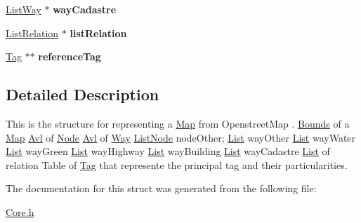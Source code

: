 \begin{DoxyCompactItemize}
\item 
\hypertarget{structMap_ae6bc84ef3523d7660f6e1920058bf7af}{\hyperlink{structListWay}{List\-Way} $\ast$ {\bfseries way\-Cadastre}}\label{structMap_ae6bc84ef3523d7660f6e1920058bf7af}

\item 
\hypertarget{structMap_a8d2ebc0ae7299d72d43126d5a4b79b85}{\hyperlink{structListRelation}{List\-Relation} $\ast$ {\bfseries list\-Relation}}\label{structMap_a8d2ebc0ae7299d72d43126d5a4b79b85}

\item 
\hypertarget{structMap_aa53f6ae8f105ee942028395514f54e18}{\hyperlink{structTag}{Tag} $\ast$$\ast$ {\bfseries reference\-Tag}}\label{structMap_aa53f6ae8f105ee942028395514f54e18}

\end{DoxyCompactItemize}


\subsection{Detailed Description}
This is the structure for representing a \hyperlink{structMap}{Map} from Openstreet\-Map . \hyperlink{structBounds}{Bounds} of a \hyperlink{structMap}{Map} \hyperlink{structAvl}{Avl} of \hyperlink{structNode}{Node} \hyperlink{structAvl}{Avl} of \hyperlink{structWay}{Way} \hyperlink{structListNode}{List\-Node} node\-Other; \hyperlink{structList}{List} way\-Other \hyperlink{structList}{List} way\-Water \hyperlink{structList}{List} way\-Green \hyperlink{structList}{List} way\-Highway \hyperlink{structList}{List} way\-Building \hyperlink{structList}{List} way\-Cadastre \hyperlink{structList}{List} of relation Table of \hyperlink{structTag}{Tag} that represente the principal tag and their particularities. 

The documentation for this struct was generated from the following file\-:\begin{DoxyCompactItemize}
\item 
\hyperlink{Core_8h}{Core.\-h}\end{DoxyCompactItemize}
